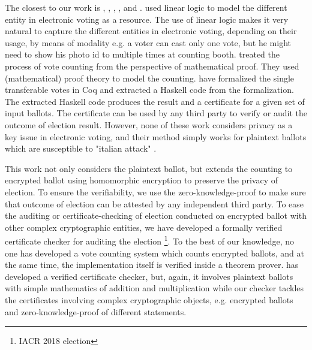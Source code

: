  The closest to our work is \cite{DeYoung:2012:LLV}, \cite{Pattinson:2015:VCM}, \cite{Pattinson:2016:MSP},
 \cite{Verity:2017:FVI:3014812.3014845}, and \cite{Ghale:2017:FVS}.  \cite{DeYoung:2012:LLV} 
 used linear logic\citep{GIRARD19871} to model the different entity in electronic voting as a resource. 
 The use of linear logic makes it very natural to capture the different entities in electronic voting,  
 depending on their usage, by means of modality e.g. a voter can cast only one vote, but he might 
 need to show his photo id to multiple times at counting booth. \cite{Pattinson:2015:VCM} treated 
 the process of vote counting from
 the perspective of mathematical proof. They used (mathematical) proof theory to model the 
 counting. \cite{Ghale:2017:FVS} have formalized the single transferable votes in Coq and 
 extracted a Haskell code from the formalization. The extracted Haskell code produces the result 
 and a certificate for a given set of input ballots. The certificate can be used by any third party to verify 
 or audit the outcome of election result.  However, none of these work considers privacy as a key 
 issue in electronic voting, and their method simply works for plaintext ballots which are  susceptible to 
 "italian attack"  \citep{Otten}   \citep{Benaloh:2009:SSC}.
 
 This work not only considers the plaintext ballot, but extends the counting to encrypted ballot 
 using homomorphic encryption to preserve the privacy of election. To ensure the verifiability, 
 we use the zero-knowledge-proof to 
 make sure that outcome of election can be attested by any independent third party. To ease the 
 auditing or certificate-checking of election conducted on encrypted ballot with other complex 
 cryptographic entities, we have developed 
 a formally verified certificate checker for auditing the election \footnote{IACR 2018 election}. 
 To the best of our knowledge, no one has developed a vote counting system which counts encrypted 
 ballots, and at the same time, the implementation itself is verified inside a theorem prover.  
 \citep{10.1007/978-3-030-03592-1_5} has developed a verified certificate checker, but, again, 
 it involves plaintext ballots  with simple mathematics of addition and multiplication while  our checker
 tackles the certificates involving complex cryptographic 
 objects, e.g. encrypted ballots and zero-knowledge-proof of different statements.
 
